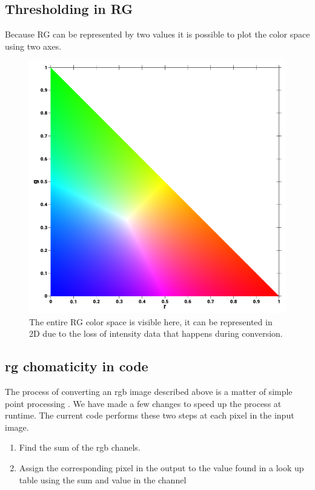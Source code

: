 \subsection{Thresholding in RG}
Because RG can be represented by two values it is possible to plot the color space using two axes. 
\begin{figure}[H]
	\centering
	\includegraphics[width=0.5\linewidth]{figure/Analysis/normRGB.png}
	\caption{The entire RG color space is visible here, it can be represented in 2D due to the loss of intensity data that happens during conversion.}
	\label{fig:rgbNorm}
\end{figure}



\subsection{rg chomaticity in code}
The process of converting an rgb image described above is a matter of simple point processing . We have made a few changes to speed up the process at runtime. The current code performs these two steps at each pixel in the input image.\\
\begin{enumerate}
	\item Find the sum of the rgb chanels.
	\item Assign the corresponding pixel in the output to the value found in a look up table using the sum and value in the channel\\
\end{enumerate}


